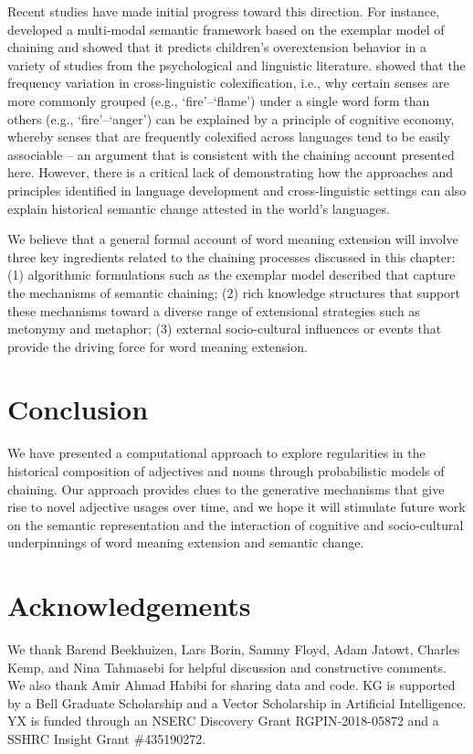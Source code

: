 \documentclass[output=paper]{langsci/langscibook}
\begin{document}
Recent studies have made initial progress toward this direction. For instance, \citet{ferreira} developed a multi-modal semantic framework based on the exemplar model of chaining and showed that it predicts children's overextension behavior in a variety of studies from the psychological and linguistic literature. \citet{xu2020conceptual} showed that the frequency variation in cross-linguistic colexification, i.e., why certain senses are more commonly grouped (e.g., `fire'--`flame') under a single word form than others (e.g., `fire'--`anger') can be explained by a principle of cognitive economy, whereby senses that are frequently colexified across languages tend to be easily associable -- an argument that is consistent with the chaining account presented here. However, there is a critical lack of demonstrating how the approaches and principles identified in language development and cross-linguistic settings can also explain historical semantic change attested in the world's languages.

We believe that a general formal account of word meaning extension will involve three key ingredients related to the chaining processes discussed in this chapter: (1) algorithmic formulations such as the exemplar model described that capture the  mechanisms of semantic chaining; (2) rich knowledge structures that support these mechanisms toward a diverse range of extensional strategies such as metonymy and metaphor; (3) external socio-cultural influences or events that provide the driving force for word meaning extension.

\section{Conclusion}

We have presented a computational approach to explore regularities in the historical composition of adjectives and nouns through probabilistic models of chaining. Our approach provides clues to the generative mechanisms that give rise to novel adjective usages over time, and we hope it will stimulate future work on the semantic representation and the interaction of cognitive and socio-cultural underpinnings of word meaning extension and semantic change.




\section*{Acknowledgements}
We thank Barend Beekhuizen, Lars Borin, Sammy
Floyd, Adam Jatowt, Charles Kemp, and Nina Tahmasebi for helpful discussion and constructive comments. We also thank Amir Ahmad Habibi for sharing data and code. KG is supported by a Bell Graduate Scholarship and a Vector Scholarship in Artificial Intelligence. YX is funded through an NSERC Discovery Grant RGPIN-2018-05872 and a SSHRC Insight Grant \#435190272.
\end{document}

